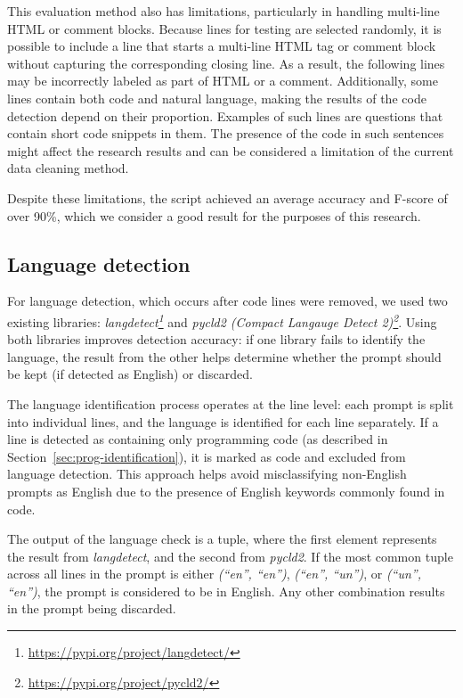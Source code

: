 This evaluation method also has limitations, particularly in handling multi-line HTML or comment blocks. Because lines for testing are selected randomly, it is possible to include a line that starts a multi-line HTML tag or comment block without capturing the corresponding closing line. As a result, the following lines may be incorrectly labeled as part of HTML or a comment. Additionally, some lines contain both code and natural language, making the results of the code detection depend on their proportion. Examples of such lines are questions that contain short code snippets in them. The presence of the code in such sentences might affect the research results and can be considered a limitation of the current data cleaning method. 

Despite these limitations, the script achieved an average accuracy and F-score of over 90\%, which we consider a good result for the purposes of this research.

\subsection{Language detection}
For language detection, which occurs after code lines were removed, we used two existing libraries: \textit{langdetect\footnote{\url{https://pypi.org/project/langdetect/}}} and \textit{pycld2 (Compact Langauge Detect 2)\footnote{\url{https://pypi.org/project/pycld2/}}}. Using both libraries improves detection accuracy: if one library fails to identify the language, the result from the other helps determine whether the prompt should be kept (if detected as English) or discarded.

The language identification process operates at the line level: each \linebreak prompt is split into individual lines, and the language is identified for each line separately. If a line is detected as containing only programming code (as described in Section~\ref{sec:prog-identification}), it is marked as code and excluded from language detection. This approach helps avoid misclassifying non-English prompts as English due to the presence of English keywords commonly found in code.

The output of the language check is a tuple, where the first element represents the result from \textit{langdetect}, and the second from \textit{pycld2}. If the most common tuple across all lines in the prompt is either \textit{(``en'', ``en'')}, \textit{(``en'', ``un'')}, or \textit{(``un'', ``en'')}, the prompt is considered to be in English. Any other combination results in the prompt being discarded.

